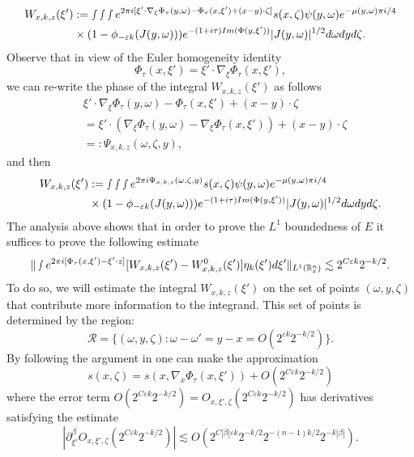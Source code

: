 \documentclass[12pt, reqno]{amsart}
\theoremstyle{definition}
\theoremstyle{remark}
\numberwithin{equation}{section}
\begin{document}
\begin{align*}
    W_{x,k,z}(\xi')&:= \smallint\smallint\smallint e^{2\pi i[\xi'\cdot \nabla_\xi\Phi_\tau(y,\omega)-\Phi_\tau(x,\xi')+ (x-y)\cdot \zeta]}s(x,\zeta)\psi(y,\omega)e^{-\mu(y,\omega)\pi i/4} \\
&\times (1-\phi_{-\varepsilon k}(J(y,\omega)))e^{-(1+i\tau)\textnormal{Im}(\Phi(y,\xi'))} |J(y,\omega)|^{1/2}d\omega dy d\zeta.
\end{align*} 
Observe that in view of the Euler homogeneity identity $$\Phi_\tau(x,\xi')=\xi'\cdot \nabla_\xi\Phi_\tau(x,\xi'),$$ we can re-write the phase of the integral $ W_{x,k,z}(\xi')$ as follows
\begin{align*}
 &\xi'\cdot \nabla_\xi\Phi_\tau(y,\omega)-\Phi_\tau(x,\xi')+ (x-y)\cdot \zeta\\
 &= \xi'\cdot( \nabla_\xi\Phi_\tau(y,\omega)- \nabla_\xi\Phi_\tau(x,\xi'))+ (x-y)\cdot \zeta\\
 &=:\Psi_{x,k,z}(\omega, \zeta,y),
\end{align*}and then
\begin{align*}
    W_{x,k,z}(\xi')&:= \smallint\smallint\smallint e^{2\pi i \Psi_{x,k,z}(\omega, \zeta,y) }s(x,\zeta)\psi(y,\omega)e^{-\mu(y,\omega)\pi i/4} \\
&\times (1-\phi_{-\varepsilon k}(J(y,\omega)))e^{-(1+i\tau)\textnormal{Im}(\Phi(y,\xi'))} |J(y,\omega)|^{1/2}d\omega dy d\zeta.
\end{align*} 
The analysis above shows that in order to prove  the $L^1$ boundedness of $E$  it suffices to prove the following estimate 
\begin{equation}\label{W:errors}
    \Vert \smallint e^{2\pi i[\Phi_\tau(x,\xi') -\xi'\cdot z]}  [W_{x,k,z}(\xi')- W^{0}_{x,k,z}(\xi')]\eta_{k}(\xi')d\xi'\Vert_{L^1(\mathbb{R}^n_x)}\lesssim 2^{C\varepsilon k}2^{-k/2}.
\end{equation} 
To do so, we will estimate the integral $W_{x,k,z}(\xi')$ on the set of points  $(\omega,y,\zeta)$ that contribute more information to the integrand. This set of points is determined by the region:
$$ \mathscr{R}=\{(\omega,y,\zeta):\omega-\omega'=y-x=O(2^{\varepsilon k}2^{-k/2})\}.$$
By following the argument in \cite[Page 19]{Tao} one can make the approximation 
$$s(x,\zeta)=s(x,\nabla_x\Phi_\tau(x,\xi'))+O(2^{C\varepsilon k}2^{-k/2})$$
where the error term $O(2^{C\varepsilon k}2^{-k/2})=O_{x,\xi',\zeta}(2^{C\varepsilon k}2^{-k/2})$ has derivatives satisfying the estimate
\begin{equation}\label{remainder:term:final}
    |\partial_{\xi'}^\beta O_{x,\xi',\zeta}(2^{C\varepsilon k}2^{-k/2})|\lesssim O(2^{C|\beta|\varepsilon k}2^{-k/2}2^{-(n-1)k/2}2^{-k|\beta|}).
\end{equation}
\end{document}
